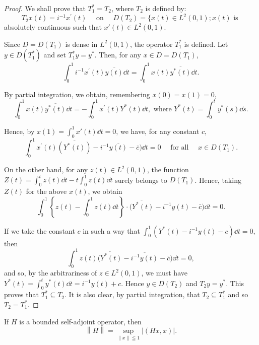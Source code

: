 \begin{proof}
 We shall prove that $T_1^* = T_2$, where $T_2$ is defined by: 
\[
T _{2} x (t) = i ^{-1} x ^{\prime} (t) \quad \text{ on } \quad D (T _{2}) = \{x (t) \in L ^{2} (0, 1); x (t) \text{ is }
\]
absolutely continuous such that $x'(t) \in L^2(0, 1)$. 

Since $D = D(T_{1})$ is dense in $L^2(0,1)$, the operator $T_1^*$ is defined. Let $y \in D(T_1^*)$ and set $T_1^* y = y^*$. Then, for any $x \in D = D(T_1)$, 
\[
\int_{0} ^{1} i ^{-1} x ^{\prime} (t) \overline {{y (t)}} \dd t = \int_{0} ^{1} x (t) \overline {{y ^{*} (t)}} \dd t.
\]

By partial integration, we obtain, remembering $x(0) = x(1) = 0$, 
\[
\int_{0} ^{1} x (t) \overline {{{y ^{*} (t)}}} \dd t = - \int_{0} ^{1} x ^{\prime} (t) \overline {{{Y ^{*} (t)}}} \dd t, \text{ where } Y ^{*} (t) = \int_{0} ^{t} y ^{*} (s) \dd s.
\]

Hence, by $x(1) = \int_{0}^{1} x'(t) \dd t = 0$, we have, for any constant $c$, 
\[
\int_{0} ^{1} x ^{\prime} (t) \overline {{{(Y ^{*} (t))}}} - i ^{-1} \overline {{{y (t)}}} - \overline {{{c}}}) \dd t = 0 \quad \text{ for all } \quad x \in D (T _{1}).
\]

On the other hand, for any $z(t) \in L^2(0, 1)$, the function $Z(t) = \int_0^t z(t) \dd t - t \int_0^1 z(t) \dd t$ surely belongs to $D(T_1)$. Hence, taking $Z(t)$ for the above $x(t)$, we obtain 
\[
\int_{0} ^{1} \left\{z (t) - \int_{0} ^{1} z (t) \dd t \right\} \cdot \overline {{(Y ^{*} (t)}} - i ^{-1} y (t) - \bar {c}) \dd t = 0.
\]

If we take the constant $c$ in such a way that $\int_0^1 (Y^* (t) - i^{-1}y(t) - c)\dd t = 0$, then 
\[
\int_{0} ^{1} z (t) \overline {{(Y ^{*} (t)}} - \overline {{i ^{-1} y (t)}} - \overline {{c}}) \dd t = 0,
\]
and so, by the arbitrariness of $z \in L^2(0,1)$, we must have $Y^*(t) = \int_0^t y^*(t) \dd t = i^{-1} y(t) + c$. Hence $y \in D(T_2)$ and $T_2y = y^*$. This proves that $T_1^* \subseteq T_2$. It is also clear, by partial integration, that $T_2 \subseteq T_1^*$ and so $T_2 = T_1^*$. 
\end{proof}

\begin{theorem}\label{thm:VII.3.Theorem.3} If $H$ is a bounded self-adjoint operator, then 
\begin{equation}\label{eq:VII.3.3}
\left\| H \right\| = \sup\limits _{\left\| x \right\| \leqq 1} \left| (H x, x) \right|.
\end{equation}
\end{theorem}

